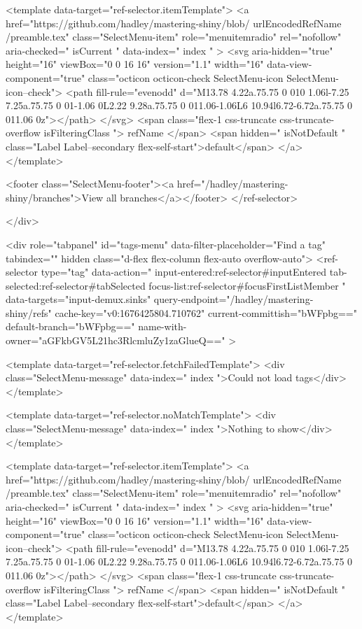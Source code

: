               

<template data-target="ref-selector.itemTemplate">
  <a href="https://github.com/hadley/mastering-shiny/blob/{{ urlEncodedRefName }}/preamble.tex" class="SelectMenu-item" role="menuitemradio" rel="nofollow" aria-checked="{{ isCurrent }}" data-index="{{ index }}" >
    <svg aria-hidden="true" height="16" viewBox="0 0 16 16" version="1.1" width="16" data-view-component="true" class="octicon octicon-check SelectMenu-icon SelectMenu-icon--check">
    <path fill-rule="evenodd" d="M13.78 4.22a.75.75 0 010 1.06l-7.25 7.25a.75.75 0 01-1.06 0L2.22 9.28a.75.75 0 011.06-1.06L6 10.94l6.72-6.72a.75.75 0 011.06 0z"></path>
</svg>
    <span class="flex-1 css-truncate css-truncate-overflow {{ isFilteringClass }}">{{ refName }}</span>
    <span hidden="{{ isNotDefault }}" class="Label Label--secondary flex-self-start">default</span>
  </a>
</template>


              <footer class="SelectMenu-footer"><a href="/hadley/mastering-shiny/branches">View all branches</a></footer>
          </ref-selector>

        </div>

        <div role="tabpanel" id="tags-menu" data-filter-placeholder="Find a tag" tabindex="" hidden class="d-flex flex-column flex-auto overflow-auto">
          <ref-selector
            type="tag"
            data-action="
              input-entered:ref-selector#inputEntered
              tab-selected:ref-selector#tabSelected
              focus-list:ref-selector#focusFirstListMember
            "
            data-targets="input-demux.sinks"
            query-endpoint="/hadley/mastering-shiny/refs"
            cache-key="v0:1676425804.710762"
            current-committish="bWFpbg=="
            default-branch="bWFpbg=="
            name-with-owner="aGFkbGV5L21hc3RlcmluZy1zaGlueQ=="
          >

            <template data-target="ref-selector.fetchFailedTemplate">
              <div class="SelectMenu-message" data-index="{{ index }}">Could not load tags</div>
            </template>

            <template data-target="ref-selector.noMatchTemplate">
              <div class="SelectMenu-message" data-index="{{ index }}">Nothing to show</div>
            </template>

              

<template data-target="ref-selector.itemTemplate">
  <a href="https://github.com/hadley/mastering-shiny/blob/{{ urlEncodedRefName }}/preamble.tex" class="SelectMenu-item" role="menuitemradio" rel="nofollow" aria-checked="{{ isCurrent }}" data-index="{{ index }}" >
    <svg aria-hidden="true" height="16" viewBox="0 0 16 16" version="1.1" width="16" data-view-component="true" class="octicon octicon-check SelectMenu-icon SelectMenu-icon--check">
    <path fill-rule="evenodd" d="M13.78 4.22a.75.75 0 010 1.06l-7.25 7.25a.75.75 0 01-1.06 0L2.22 9.28a.75.75 0 011.06-1.06L6 10.94l6.72-6.72a.75.75 0 011.06 0z"></path>
</svg>
    <span class="flex-1 css-truncate css-truncate-overflow {{ isFilteringClass }}">{{ refName }}</span>
    <span hidden="{{ isNotDefault }}" class="Label Label--secondary flex-self-start">default</span>
  </a>
</template>



